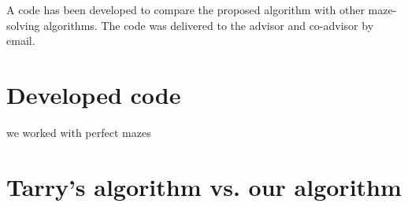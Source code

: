 \label{section_results}
A code has been developed to compare the proposed algorithm with other maze-solving algorithms. The code was delivered to the advisor and co-advisor by email.

\section{Developed code}

we worked with perfect mazes

\section{Tarry's algorithm vs. our algorithm}
\label{section_results_tarry_vs_our}